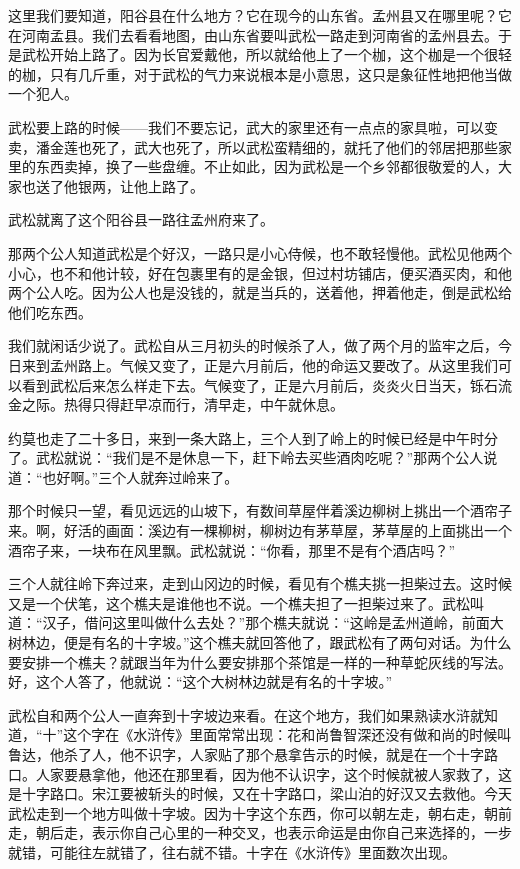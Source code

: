 \par 这里我们要知道，阳谷县在什么地方？它在现今的山东省。孟州县又在哪里呢？它在河南孟县。我们去看看地图，由山东省要叫武松一路走到河南省的孟州县去。于是武松开始上路了。因为长官爱戴他，所以就给他上了一个枷，这个枷是一个很轻的枷，只有几斤重，对于武松的气力来说根本是小意思，这只是象征性地把他当做一个犯人。
\par 武松要上路的时候——我们不要忘记，武大的家里还有一点点的家具啦，可以变卖，潘金莲也死了，武大也死了，所以武松蛮精细的，就托了他们的邻居把那些家里的东西卖掉，换了一些盘缠。不止如此，因为武松是一个乡邻都很敬爱的人，大家也送了他银两，让他上路了。
\par 武松就离了这个阳谷县一路往孟州府来了。
\par 那两个公人知道武松是个好汉，一路只是小心侍候，也不敢轻慢他。武松见他两个小心，也不和他计较，好在包裹里有的是金银，但过村坊铺店，便买酒买肉，和他两个公人吃。因为公人也是没钱的，就是当兵的，送着他，押着他走，倒是武松给他们吃东西。
\par 我们就闲话少说了。武松自从三月初头的时候杀了人，做了两个月的监牢之后，今日来到孟州路上。气候又变了，正是六月前后，他的命运又要改了。从这里我们可以看到武松后来怎么样走下去。气候变了，正是六月前后，炎炎火日当天，铄石流金之际。热得只得赶早凉而行，清早走，中午就休息。
\par 约莫也走了二十多日，来到一条大路上，三个人到了岭上的时候已经是中午时分了。武松就说：“我们是不是休息一下，赶下岭去买些酒肉吃呢？”那两个公人说道：“也好啊。”三个人就奔过岭来了。
\par 那个时候只一望，看见远远的山坡下，有数间草屋伴着溪边柳树上挑出一个酒帘子来。啊，好活的画面：溪边有一棵柳树，柳树边有茅草屋，茅草屋的上面挑出一个酒帘子来，一块布在风里飘。武松就说：“你看，那里不是有个酒店吗？”
\par 三个人就往岭下奔过来，走到山冈边的时候，看见有个樵夫挑一担柴过去。这时候又是一个伏笔，这个樵夫是谁他也不说。一个樵夫担了一担柴过来了。武松叫道：“汉子，借问这里叫做什么去处？”那个樵夫就说：“这岭是孟州道岭，前面大树林边，便是有名的十字坡。”这个樵夫就回答他了，跟武松有了两句对话。为什么要安排一个樵夫？就跟当年为什么要安排那个茶馆是一样的一种草蛇灰线的写法。好，这个人答了，他就说：“这个大树林边就是有名的十字坡。”
\par 武松自和两个公人一直奔到十字坡边来看。在这个地方，我们如果熟读水浒就知道，“十”这个字在《水浒传》里面常常出现：花和尚鲁智深还没有做和尚的时候叫鲁达，他杀了人，他不识字，人家贴了那个悬拿告示的时候，就是在一个十字路口。人家要悬拿他，他还在那里看，因为他不认识字，这个时候就被人家救了，这是十字路口。宋江要被斩头的时候，又在十字路口，梁山泊的好汉又去救他。今天武松走到一个地方叫做十字坡。因为十字这个东西，你可以朝左走，朝右走，朝前走，朝后走，表示你自己心里的一种交叉，也表示命运是由你自己来选择的，一步就错，可能往左就错了，往右就不错。十字在《水浒传》里面数次出现。
